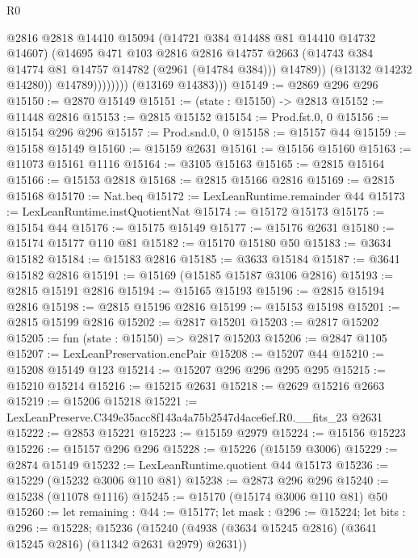 \begin{lexlean}{R0}
\begin{coremodule}
                            @2816
                            @2818
                            @14410
                            @15094
                            (@14721 @384 @14488 @81 @14410 @14732 @14607)
                            (@14695
                              @471
                              @103
                              @2816
                              @2816
                              @14757
                              @2663
                              (@14743 @384 @14774 @81 @14757 @14782 (@2961 (@14784 @384)))
                              @14789))
                          (@13132 @14232 @14280))
                        @14789))))))))
        (@13169 @14383)))
@15149 := @2869 @296 @296
@15150 := @2870 @15149
@15151 := (state : @15150) -> @2813
@15152 := @11448 @2816
@15153 := @2815 @15152
@15154 := Prod.fst.{0, 0}
@15156 := @15154 @296 @296
@15157 := Prod.snd.{0, 0}
@15158 := @15157 @44
@15159 := @15158 @15149
@15160 := @15159 @2631
@15161 := @15156 @15160
@15163 := @11073 @15161 @1116
@15164 := @3105 @15163
@15165 := @2815 @15164
@15166 := @15153 @2818
@15168 := @2815 @15166 @2816
@15169 := @2815 @15168
@15170 := Nat.beq
@15172 := LexLeanRuntime.remainder @44
@15173 := LexLeanRuntime.instQuotientNat
@15174 := @15172 @15173
@15175 := @15154 @44
@15176 := @15175 @15149
@15177 := @15176 @2631
@15180 := @15174 @15177 @110 @81
@15182 := @15170 @15180 @50
@15183 := @3634 @15182
@15184 := @15183 @2816
@15185 := @3633 @15184
@15187 := @3641 @15182 @2816
@15191 := @15169 (@15185 @15187 @3106 @2816)
@15193 := @2815 @15191 @2816
@15194 := @15165 @15193
@15196 := @2815 @15194 @2816
@15198 := @2815 @15196 @2816
@15199 := @15153 @15198
@15201 := @2815 @15199 @2816
@15202 := @2817 @15201
@15203 := @2817 @15202
@15205 := fun (state : @15150) => @2817 @15203
@15206 := @2847 @1105
@15207 := LexLeanPreservation.encPair
@15208 := @15207 @44
@15210 := @15208 @15149 @123
@15214 := @15207 @296 @296 @295 @295
@15215 := @15210 @15214
@15216 := @15215 @2631
@15218 := @2629 @15216 @2663
@15219 := @15206 @15218
@15221 := LexLeanPreserve.C349e35acc8f143a4a75b2547d4ace6ef.R0.__fits_23 @2631
@15222 := @2853 @15221
@15223 := @15159 @2979
@15224 := @15156 @15223
@15226 := @15157 @296 @296
@15228 := @15226 (@15159 @3006)
@15229 := @2874 @15149
@15232 := LexLeanRuntime.quotient @44 @15173
@15236 := @15229 (@15232 @3006 @110 @81)
@15238 := @2873 @296 @296
@15240 := @15238 (@11078 @1116)
@15245 := @15170 (@15174 @3006 @110 @81) @50
@15260 := let remaining : @44 := @15177;
  let mask : @296 := @15224;
  let bits : @296 := @15228;
  @15236 (@15240 (@4938 (@3634 @15245 @2816) (@3641 @15245 @2816) (@11342 @2631 @2979) @2631))

\end{coremodule}
\end{lexlean}
